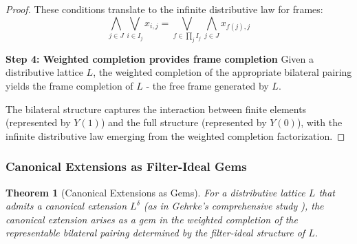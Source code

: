 \documentclass[11pt]{article}
\theoremstyle{plain}
\newtheorem{theorem}{Theorem}[section]
\theoremstyle{definition}
\theoremstyle{remark}
\begin{document}
\begin{proof}
These conditions translate to the infinite distributive law for frames:
$$\bigwedge_{j \in J} \bigvee_{i \in I_j} x_{i,j} = \bigvee_{f \in \prod_j I_j} \bigwedge_{j \in J} x_{f(j),j}$$

\textbf{Step 4: Weighted completion provides frame completion}
Given a distributive lattice $L$, the weighted completion of the appropriate bilateral pairing yields the frame completion of $L$ - the free frame generated by $L$.

The bilateral structure captures the interaction between finite elements (represented by $Y(1)$) and the full structure (represented by $Y(0)$), with the infinite distributive law emerging from the weighted completion factorization.
\end{proof}

\subsubsection{Canonical Extensions as Filter-Ideal Gems}

\begin{theorem}[Canonical Extensions as Gems]\label{thm:canonical-extensions-gems}
For a distributive lattice $L$ that admits a canonical extension $L^{\delta}$ (as in Gehrke's comprehensive study \cite{gehrke2001bounded}), the canonical extension arises as a gem in the weighted completion of the representable bilateral pairing determined by the filter-ideal structure of $L$.
\end{theorem}
\end{document}
